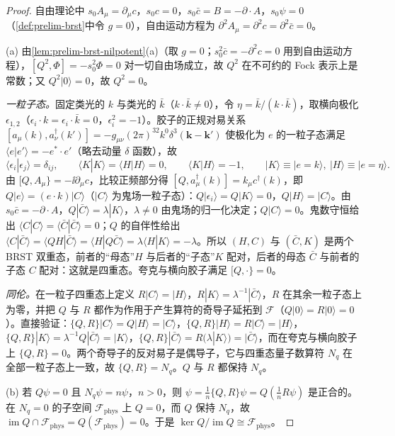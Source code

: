 \begin{proof}
自由理论中 $s_0A_\mu=\partial_\mu c$，$s_0c=0$，$s_0\bar c=B=-\partial\cdot A$，$s_0\psi=0$（\cref{def:prelim-brst}中令 $g=0$），自由运动方程为 $\partial^2A_\mu=\partial^2c=\partial^2\bar c=0$。

(a) 由\cref{lem:prelim-brst-nilpotent}(a)（取 $g=0$；$s_0^2\bar c=-\partial^2c=0$ 用到自由运动方程），$[Q^2,\Phi]=-s_0^2\Phi=0$ 对一切自由场成立，故 $Q^2$ 在不可约的 Fock 表示上是常数；又 $Q^2|0\rangle=0$，故 $Q^2=0$。

\emph{一粒子态。}固定类光的 $k$ 与类光的 $\bar k$（$k\cdot\bar k\ne0$），令 $\eta=\bar k/(k\cdot\bar k)$，取横向极化 $\epsilon_{1,2}$（$\epsilon_i\cdot k=\epsilon_i\cdot\bar k=0$，$\epsilon_i^2=-1$）。胶子的正规对易关系 $[a_\mu(k),a^\dagger_\nu(k')]=-g_{\mu\nu}(2\pi)^32k^0\delta^3(\mathbf k-\mathbf k')$ 使极化为 $e$ 的一粒子态满足 $\langle e|e'\rangle=-e^*\cdot e'$（略去动量 $\delta$ 函数），故
\[
\langle\epsilon_i|\epsilon_j\rangle=\delta_{ij},\qquad \langle K|K\rangle=\langle H|H\rangle=0,\qquad \langle K|H\rangle=-1,\qquad |K\rangle\equiv|e=k\rangle,\ |H\rangle\equiv|e=\eta\rangle .
\]
由 $[Q,A_\mu\}=-\ii\partial_\mu c$，比较正频部分得 $[Q,a^\dagger_\mu(k)]=k_\mu c^\dagger(k)$，即 $Q|e\rangle=(e\cdot k)|C\rangle$（$|C\rangle$ 为鬼场一粒子态）：$Q|\epsilon_i\rangle=Q|K\rangle=0$，$Q|H\rangle=|C\rangle$。由 $s_0\bar c=-\partial\cdot A$，$Q|\bar C\rangle=\lambda|K\rangle$，$\lambda\ne0$ 由鬼场的归一化决定；$Q|C\rangle=0$。鬼数守恒给出 $\langle C|C\rangle=\langle\bar C|\bar C\rangle=0$；$Q$ 的自伴性给出 $\langle C|\bar C\rangle=\langle QH|\bar C\rangle=\langle H|Q\bar C\rangle=\lambda\langle H|K\rangle=-\lambda$。所以 $(H,C)$ 与 $(\bar C,K)$ 是两个 BRST 双重态，前者的“母态”$H$ 与后者的“子态”$K$ 配对，后者的母态 $\bar C$ 与前者的子态 $C$ 配对：这就是四重态。夸克与横向胶子满足 $[Q,\cdot\}=0$。

\emph{同伦。}在一粒子四重态上定义 $R|C\rangle=|H\rangle$，$R|K\rangle=\lambda^{-1}|\bar C\rangle$，$R$ 在其余一粒子态上为零，并把 $Q$ 与 $R$ 都作为作用于产生算符的奇导子延拓到 $\mathcal F$（$Q|0\rangle=R|0\rangle=0$）。直接验证：$\{Q,R\}|C\rangle=Q|H\rangle=|C\rangle$，$\{Q,R\}|H\rangle=R|C\rangle=|H\rangle$，$\{Q,R\}|K\rangle=\lambda^{-1}Q|\bar C\rangle=|K\rangle$，$\{Q,R\}|\bar C\rangle=R(\lambda|K\rangle)=|\bar C\rangle$，而在夸克与横向胶子上 $\{Q,R\}=0$。两个奇导子的反对易子是偶导子，它与四重态量子数算符 $N_q$ 在全部一粒子态上一致，故 $\{Q,R\}=N_q$。$Q$ 与 $R$ 都保持 $N_q$。

(b) 若 $Q\psi=0$ 且 $N_q\psi=n\psi$，$n>0$，则 $\psi=\frac1n\{Q,R\}\psi=Q(\frac1nR\psi)$ 是正合的。在 $N_q=0$ 的子空间 $\mathcal F_{\mathrm{phys}}$ 上 $Q=0$，而 $Q$ 保持 $N_q$，故 $\operatorname{im}Q\cap\mathcal F_{\mathrm{phys}}=Q(\mathcal F_{\mathrm{phys}})=0$。于是 $\ker Q/\operatorname{im}Q\cong\mathcal F_{\mathrm{phys}}$。


\end{proof}
